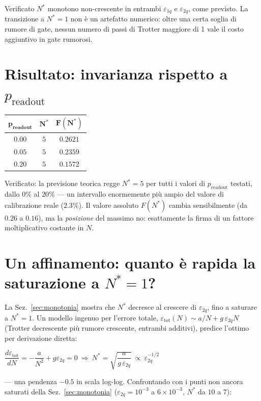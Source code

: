 \documentclass[11pt,a4paper]{article}
\begin{document}
\begin{okbox}{Verificato}
$N^*$ monotono non-crescente in entrambi $\varepsilon_{1q}$ e
$\varepsilon_{2q}$, come previsto. La transizione a $N^*=1$ non è un
artefatto numerico: oltre una certa soglia di rumore di gate, nessun
numero di passi di Trotter maggiore di 1 vale il costo aggiuntivo in
gate rumorosi.
\end{okbox}

\section{Risultato: invarianza rispetto a \texorpdfstring{$p_\text{readout}$}{p readout}}

\begin{center}
\renewcommand{\arraystretch}{1.2}
\begin{tabular}{@{}ccc@{}}
\toprule
$\boldsymbol{p_\text{readout}}$ & $\boldsymbol{N^*}$ & $\boldsymbol{F(N^*)}$\\
\midrule
$0.00$ & $5$ & $0.2621$\\
$0.05$ & $5$ & $0.2359$\\
$0.20$ & $5$ & $0.1572$\\
\bottomrule
\end{tabular}
\end{center}

\begin{okbox}{Verificato: la previsione teorica regge}
$N^*=5$ per tutti i valori di $p_\text{readout}$ testati, dallo $0\%$ al
$20\%$ --- un intervallo enormemente più ampio del valore di
calibrazione reale ($2.3\%$). Il valore assoluto $F(N^*)$ cambia
sensibilmente (da $0.26$ a $0.16$), ma la \emph{posizione} del massimo
no: esattamente la firma di un fattore moltiplicativo costante in $N$.
\end{okbox}

\section{Un affinamento: quanto è rapida la saturazione a \texorpdfstring{$N^*=1$}{N*=1}?}

La Sez.~\ref{sec:monotonia} mostra che $N^*$ decresce al crescere di $\varepsilon_{2q}$,
fino a saturare a $N^*=1$. Un modello ingenuo per l'errore totale,
$\varepsilon_\text{tot}(N)\sim a/N + g\,\varepsilon_{2q}N$ (Trotter
decrescente più rumore crescente, entrambi additivi), predice
l'ottimo per derivazione diretta:
\begin{keyeq}
\centering
$\dfrac{d\varepsilon_\text{tot}}{dN} = -\dfrac{a}{N^2} + g\varepsilon_{2q} = 0
\ \Longrightarrow\ N^* = \sqrt{\dfrac{a}{g\,\varepsilon_{2q}}} \ \propto\ \varepsilon_{2q}^{-1/2}$
\end{keyeq}
--- una pendenza $-0.5$ in scala log-log. Confrontando con i punti non
ancora saturati della Sez.~\ref{sec:monotonia} ($\varepsilon_{2q}=10^{-3}$ a
$6\times10^{-3}$, $N^*$ da $10$ a $7$):
\end{document}
